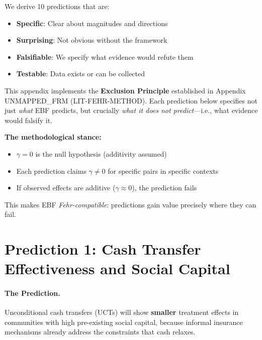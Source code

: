 We derive 10 predictions that are:
\begin{itemize}
    \item \textbf{Specific}: Clear about magnitudes and directions
    \item \textbf{Surprising}: Not obvious without the framework
    \item \textbf{Falsifiable}: We specify what evidence would refute them
    \item \textbf{Testable}: Data exists or can be collected
\end{itemize}

\begin{tcolorbox}[colback=blue!5!white, colframe=blue!75!black,
    title=\textbf{Connection to Appendix UNMAPPED_FRM: The Exclusion Principle}]
This appendix implements the \textbf{Exclusion Principle} established in Appendix UNMAPPED_FRM
(LIT-FEHR-METHOD). Each prediction below specifies not just \textit{what} EBF predicts,
but crucially \textit{what it does not predict}---i.e., what evidence would falsify it.

\textbf{The methodological stance:}
\begin{itemize}[noitemsep]
    \item $\gamma = 0$ is the null hypothesis (additivity assumed)
    \item Each prediction claims $\gamma \neq 0$ for specific pairs in specific contexts
    \item If observed effects are additive ($\gamma \approx 0$), the prediction fails
\end{itemize}

This makes EBF \textit{Fehr-compatible}: predictions gain value precisely where they can fail.
\end{tcolorbox}


\section{Prediction 1: Cash Transfer Effectiveness and Social Capital}
\label{sec:S-prediction1}

\paragraph{The Prediction.}
Unconditional cash transfers (UCTs) will show \textbf{smaller} treatment effects in communities with high pre-existing social capital, because informal insurance mechanisms already address the constraints that cash relaxes.

